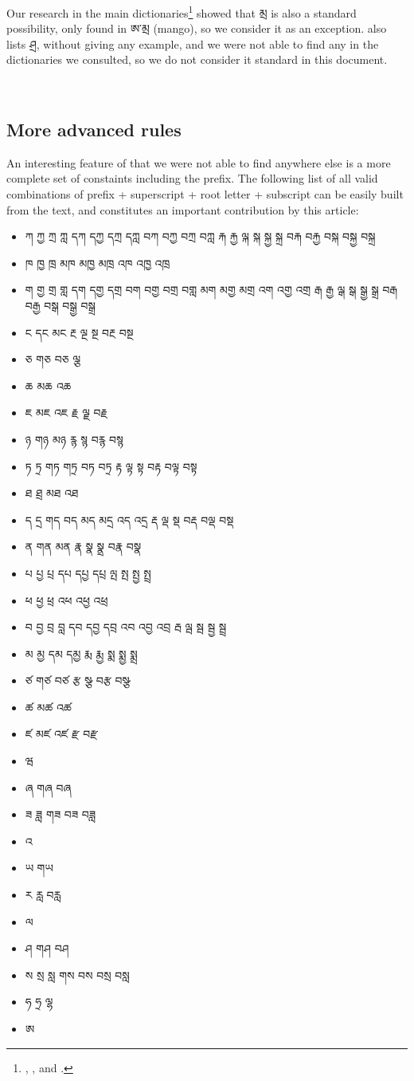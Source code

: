 \documentclass[%
a4paper,%
pagesize,%
12pt,%
parskip=off,%
bibliography=totoc,%
numbers=noenddot,%
DIV=12,%
twoside=semi,%
headings=normal%
]{scrartcl}
\begin{document}
Our research in the main dictionaries\footnote{\cite{DorjeDagyig}, \cite{YisunTsikchen}, \cite{MonlamGrandDict} and \cite{DungkarEncyclopedia}.} showed that མྲ is also a standard possibility, only found in ཨ་མྲ (mango), so we consider it as an exception. \cite{TournadreMST} also lists ཤྲ, without giving any example, and we were not able to find any in the dictionaries we consulted, so we do not consider it standard in this document.

­\subsection{More advanced rules}

An interesting feature of \cite{TsheshabGrammarTopics} that we were not able to find anywhere else is a more complete set of constaints including the prefix. The following list of all valid combinations of prefix + superscript + root letter + subscript can be easily built from the text, and constitutes an important contribution by this article:

\begin{itemize}
\item ཀ ཀྱ ཀྲ ཀླ དཀ དཀྱ དཀྲ དཀླ བཀ བཀྱ བཀྲ བཀླ རྐ རྐྱ ལྐ སྐ སྐྱ སྐྲ བརྐ བརྐྱ བསྐ བསྐྱ བསྐྲ
\item ཁ ཁྱ ཁྲ མཁ མཁྱ མཁྲ འཁ འཁྱ འཁྲ
\item ག གྱ གྲ གླ དག དགྱ དགྲ བག བགྱ བགྲ བགླ མག མགྱ མགྲ འག འགྱ འགྲ རྒ རྒྱ ལྒ སྒ སྒྱ སྒྲ བརྒ བརྒྱ བསྒ བསྒྱ བསྒྲ
\item ང དང མང རྔ ལྔ སྔ བརྔ བསྔ
\item ཅ གཅ བཅ ལྕ
\item ཆ མཆ འཆ
\item ཇ མཇ འཇ རྗ ལྗ བརྗ
\item ཉ གཉ མཉ རྙ སྙ བརྙ བསྙ
\item ཏ ཏྲ གཏ གཏྲ བཏ བཏྲ རྟ ལྟ སྟ བརྟ བལྟ བསྟ
\item ཐ ཐྲ མཐ འཐ
\item ད དྲ གད བད མད མདྲ འད འདྲ རྡ ལྡ སྡ བརྡ བལྡ བསྡ
\item ན གན མན རྣ སྣ སྣྲ བརྣ བསྣ
\item པ པྱ པྲ དཔ དཔྱ དཔྲ ལྤ སྤ སྤྱ སྤྲ
\item ཕ ཕྱ ཕྲ འཕ འཕྱ འཕྲ
\item བ བྱ བྲ བླ དབ དབྱ དབྲ འབ འབྱ འབྲ རྦ ལྦ སྦ སྦྱ སྦྲ
\item མ མྱ དམ དམྱ རྨ རྨྱ སྨ སྨྱ སྨྲ
\item ཙ གཙ བཙ རྩ སྩ བརྩ བསྩ
\item ཚ མཚ འཚ
\item ཛ མཛ འཛ རྫ བརྫ
\item ཝ
\item ཞ གཞ བཞ
\item ཟ ཟླ གཟ བཟ བཟླ
\item འ
\item ཡ གཡ
\item ར རླ བརླ
\item ལ
\item ཤ གཤ བཤ
\item ས སྲ སླ གས བས བསྲ བསླ
\item ཧ ཧྲ ལྷ
\item ཨ
\end{itemize}
\end{document}
